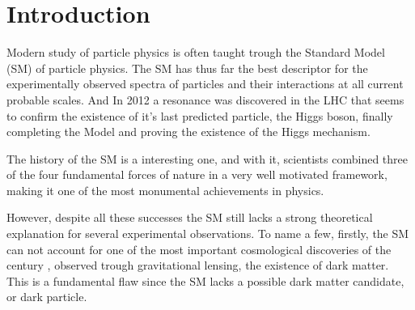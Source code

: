 
\newpage

\chapter{Introduction}

Modern study of particle physics is often taught trough the Standard Model (SM) of particle physics. The SM has thus far the best descriptor for the experimentally observed spectra of particles and their interactions at all current probable scales. And In 2012 a resonance was discovered in the LHC that seems to confirm the existence of it's last predicted particle, the Higgs boson, finally completing the Model and proving the existence of the Higgs mechanism. 


The history of the SM is a interesting one, and with it, scientists combined three of the four fundamental forces of nature in a very well motivated framework, making it one of the most monumental achievements in physics. 



However, despite all these successes the SM still lacks a strong theoretical explanation for several experimental observations. To name a few, firstly, the SM can not account for one of the most important cosmological discoveries of the century {\color{gray}, observed trough gravitational lensing,}  the existence of dark matter. This is a fundamental flaw since the SM lacks a possible dark matter candidate, or dark particle. 

